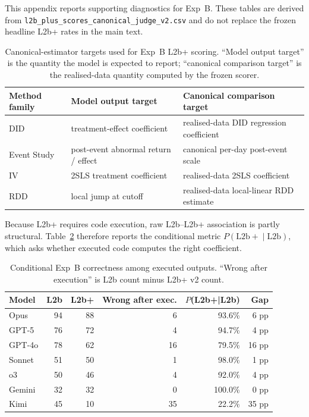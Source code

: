 \documentclass{article}
\begin{document}
This appendix reports supporting diagnostics for Exp~B. These tables are
derived from \texttt{l2b\_plus\_scores\_canonical\_judge\_v2.csv} and do not
replace the frozen headline L2b+ rates in the main text.

\begin{table}[h]
\centering
\caption{Canonical-estimator targets used for Exp~B L2b+ scoring.
``Model output target'' is the quantity the model is expected to report;
``canonical comparison target'' is the realised-data quantity computed
by the frozen scorer.}
\label{tab:canonical-targets}
\small
\renewcommand{\arraystretch}{1.12}
\begin{tabular}{lll}
\toprule
\textbf{Method family} & \textbf{Model output target} &
\textbf{Canonical comparison target} \\
\midrule
DID         & treatment-effect coefficient
            & realised-data DID regression coefficient \\
Event Study & post-event abnormal return / effect
            & canonical per-day post-event scale \\
IV          & 2SLS treatment coefficient
            & realised-data 2SLS coefficient \\
RDD         & local jump at cutoff
            & realised-data local-linear RDD estimate \\
\bottomrule
\end{tabular}
\end{table}

Because L2b+ requires code execution, raw L2b--L2b+ association is partly
structural. Table~\ref{tab:conditional-l2b} therefore reports the conditional
metric $P(\mathrm{L2b+}\mid \mathrm{L2b})$, which asks whether executed code
computes the right coefficient.

\begin{table}[h]
\centering
\caption{Conditional Exp~B correctness among executed outputs. ``Wrong after
execution'' is L2b count minus L2b+ v2 count.}
\label{tab:conditional-l2b}
\small
\renewcommand{\arraystretch}{1.08}
\begin{tabular}{lrrrrr}
\toprule
\textbf{Model} & \textbf{L2b} & \textbf{L2b+} &
\textbf{Wrong after exec.} & \textbf{$P$(L2b+|L2b)} & \textbf{Gap} \\
\midrule
Opus & 94 & 88 & 6 & 93.6\% & 6 pp \\
GPT-5 & 76 & 72 & 4 & 94.7\% & 4 pp \\
GPT-4o & 78 & 62 & 16 & 79.5\% & 16 pp \\
Sonnet & 51 & 50 & 1 & 98.0\% & 1 pp \\
o3 & 50 & 46 & 4 & 92.0\% & 4 pp \\
Gemini & 32 & 32 & 0 & 100.0\% & 0 pp \\
Kimi & 45 & 10 & 35 & 22.2\% & 35 pp \\
\bottomrule
\end{tabular}
\end{table}
\end{document}
